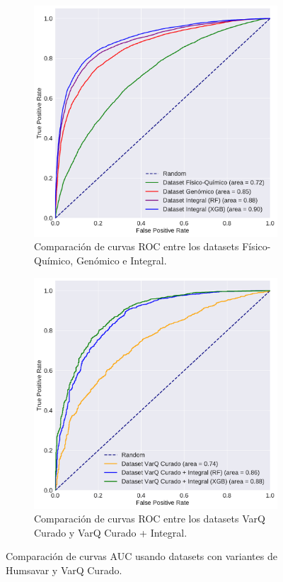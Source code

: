 \begin{figure}[H]
\centering
\begin{subfigure}[b]{0.6\textwidth}
    \centering
    \includegraphics[width=\textwidth]{documents/latex/figures/4/curvas_auc_humsavar.pdf}
    \caption{Comparación de curvas ROC entre los datasets Físico-Químico, Genómico e Integral.}
    \label{fig:curvas_auc_humsavar}
\end{subfigure}

\hfill
\hfill

\begin{subfigure}[b]{0.6\textwidth}
    \centering
    \includegraphics[width=\textwidth]{documents/latex/figures/4/curvas_auc_varq.pdf}
    \caption{Comparación de curvas ROC entre los datasets VarQ Curado y VarQ Curado + Integral.}
    \label{fig:curvas_auc_varq}
\end{subfigure}

\caption{Comparación de curvas AUC usando datasets con variantes de Humsavar y VarQ Curado.}
\end{figure}






